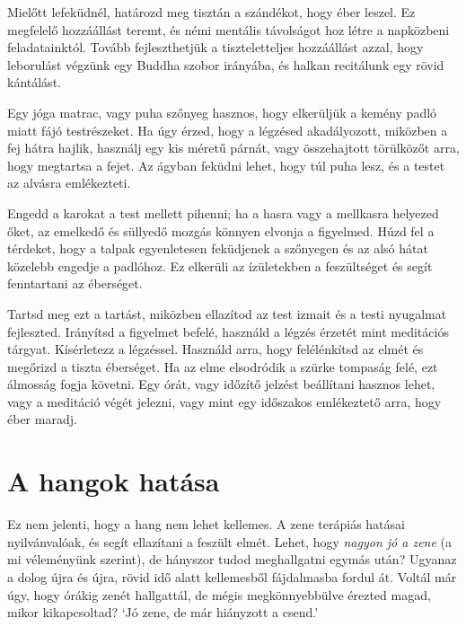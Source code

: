 \clearpage
\null\thispagestyle{empty}%
%
%
\label{illus-lying-down-meditation}%
\clearpage

Mielőtt lefeküdnél, határozd meg tisztán a szándékot, hogy éber leszel.
Ez megfelelő hozzáállást teremt, és némi mentális távolságot hoz létre a
napközbeni feladatainktól. Tovább fejleszthetjük a tiszteletteljes
hozzáállást azzal, hogy leborulást végzünk egy Buddha szobor irányába,
és halkan recitálunk egy rövid kántálást.

Egy jóga matrac, vagy puha szőnyeg hasznos, hogy elkerüljük a kemény
padló miatt fájó testrészeket. Ha úgy érzed, hogy a légzésed
akadályozott, miközben a fej hátra hajlik, használj egy kis méretű
párnát, vagy összehajtott törülközőt arra, hogy megtartsa a fejet. Az
ágyban feküdni lehet, hogy túl puha lesz, és a testet az alvásra
emlékezteti.

Engedd a karokat a test mellett pihenni; ha a hasra vagy a mellkasra
helyezed őket, az emelkedő és süllyedő mozgás könnyen elvonja a
figyelmed. Húzd fel a térdeket, hogy a talpak egyenletesen feküdjenek a
szőnyegen és az alsó hátat közelebb engedje a padlóhoz. Ez elkerüli az
ízületekben a feszültséget és segít fenntartani az éberséget.

Tartsd meg ezt a tartást, miközben ellazítod az test izmait és a testi
nyugalmat fejleszted. Irányítsd a figyelmet befelé, használd a légzés
érzetét mint meditációs tárgyat. Kísérletezz a légzéssel. Használd arra,
hogy felélénkítsd az elmét és megőrizd a tiszta éberséget. Ha az elme
elsodródik a szürke tompaság felé, ezt álmosság fogja követni. Egy órát,
vagy időzítő jelzést beállítani hasznos lehet, vagy a meditáció végét
jelezni, vagy mint egy időszakos emlékeztető arra, hogy éber maradj.

\clearpage

\section{A hangok hatása}


\noindent Ez nem jelenti, hogy a hang nem lehet kellemes. A zene
terápiás hatásai nyilvánvalóak, és segít ellazítani a feszült elmét.
Lehet, hogy \emph{nagyon jó a zene} (a mi véleményünk szerint), de
hányszor tudod meghallgatni egymás után? Ugyanaz a dolog újra és újra,
rövid idő alatt kellemesből fájdalmasba fordul át. Voltál már úgy, hogy
órákig zenét hallgattál, de mégis megkönnyebbülve érezted magad, mikor
kikapcsoltad? `Jó zene, de már hiányzott a csend.'

